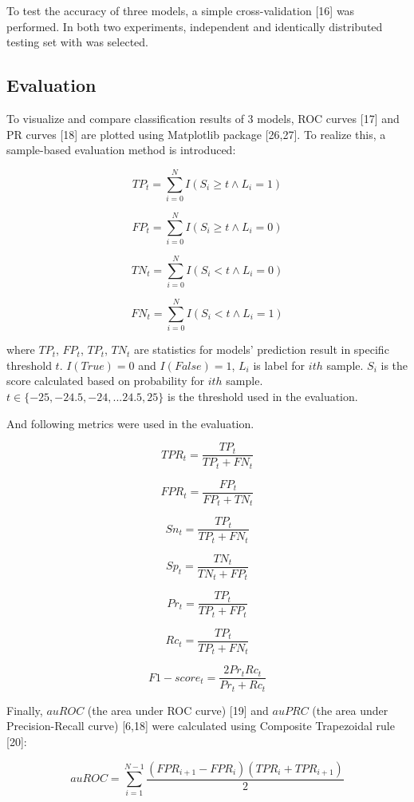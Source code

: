\documentclass[11pt]{article}
\begin{document}
To test the accuracy of three models, a simple cross-validation {[}16{]}
was performed. In both two experiments, independent and identically
distributed testing set with was selected.

    \hypertarget{evaluation}{%
\subsection{Evaluation}\label{evaluation}}

To visualize and compare classification results of 3 models, ROC curves
{[}17{]} and PR curves {[}18{]} are plotted using Matplotlib package
{[}26,27{]}. To realize this, a sample-based evaluation method is
introduced:

    \[ TP_t = \sum_{i=0}^N I(S_i\geq t \land L_i = 1) \tag{5} \]

\[ FP_t = \sum_{i=0}^N I(S_i\geq t \land L_i = 0) \tag{6}  \]

\[ TN_t = \sum_{i=0}^N I(S_i< t \land L_i = 0) \tag{7}  \]

\[ FN_t = \sum_{i=0}^N I(S_i< t \land L_i = 1) \tag{8}  \]

where \(TP_t\), \(FP_t\), \(TP_t\), \(TN_t\) are statistics for models'
prediction result in specific threshold \(t\). \(I(True) = 0\) and
\(I(False) = 1\), \(L_i\) is label for \(ith\) sample. \(S_i\) is the
score calculated based on probability for \(ith\) sample.
\(t\in \{-25, -24.5, -24, ...24.5, 25\}\) is the threshold used in the
evaluation.

And following metrics were used in the evaluation.

\[ TPR_t = \frac{TP_t}{TP_t+FN_t} \tag{9}  \]

\[ FPR_t = \frac{FP_t}{FP_t+TN_t} \tag{10}  \]

\[ Sn_t = \frac{TP_t}{TP_t+FN_t} \tag{11}  \]

\[ Sp_t = \frac{TN_t}{TN_t+FP_t} \tag{12}  \]

\[ Pr_t = \frac{TP_t}{TP_t+FP_t} \tag{13}  \]

\[ Rc_t = \frac{TP_t}{TP_t+FN_t} \tag{14}  \]

\[ F1-score_t = \frac{2Pr_t Rc_t}{Pr_t+Rc_t} \tag{15} \]

    Finally, \(auROC\) (the area under ROC curve) {[}19{]} and \(auPRC\)
(the area under Precision-Recall curve) {[}6,18{]} were calculated using
Composite Trapezoidal rule {[}20{]}:

\[ auROC = \sum_{i=1}^{N-1} \frac{(FPR_{i+1} - FPR_i)(TPR_i+TPR_{i+1})}{2} \tag{16} \]
\end{document}
